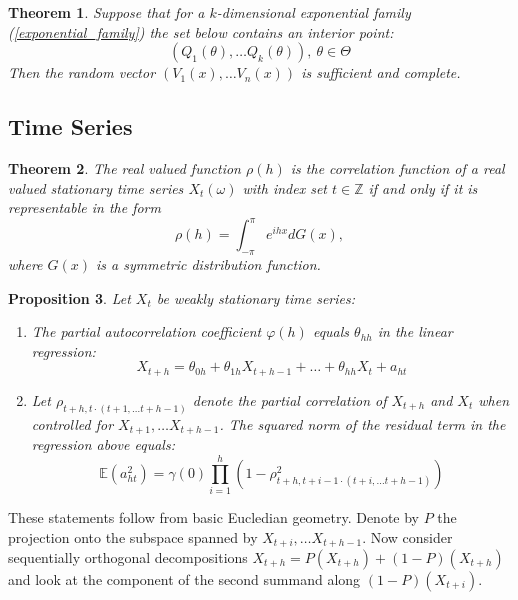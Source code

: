\documentclass[12pt]{article}
\newtheorem{theorem}{Theorem}[section]
\newtheorem{proposition}[theorem]{Proposition}
\theoremstyle{definition}
\theoremstyle{remark}
\numberwithin{equation}{section}
\newcommand{\ZZ}{\mathbb{Z}}
\newcommand{\EE}{\mathbb{E}}
\begin{document}
\begin{theorem}
	Suppose that for a $k$-dimensional exponential family (\ref{exponential_family}) the set below contains an interior point:
\begin{equation*}
	(Q_1(\theta),\ldots Q_k(\theta)),\ \theta\in\Theta
\end{equation*}
Then the random vector $\left(V_1(x),\ldots V_n(x)\right)$ is sufficient and complete.
\end{theorem}


\subsection{Time Series}

\begin{theorem}
	The real valued function $\rho(h)$ is the correlation function of a real valued stationary time series $X_t(\omega)$ with index set $t\in\ZZ$ if and only if it is representable in the form
\begin{equation*}
	\rho(h) = \int_{-\pi}^\pi e^{ihx}dG(x),
\end{equation*}
	where $G(x)$ is a symmetric distribution function.
\end{theorem}


\begin{proposition}\label{pac_properties} Let $X_t$ be weakly stationary time series:
	\begin{enumerate}
		\item The partial autocorrelation coefficient $\varphi(h)$ equals $\theta_{hh}$ in the linear regression:
		\begin{equation*}
			X_{t+h} = \theta_{0h} + \theta_{1h}X_{t+h-1} + \ldots + \theta_{hh}X_t + a_{ht}
		\end{equation*}
		\item Let $\rho_{t+h,t\cdot(t+1, \ldots t+h-1)}$ denote the partial correlation of $X_{t+h}$ and $X_t$ when controlled for $X_{t+1}, \ldots X_{t+h-1}$. The squared norm of the residual term in the regression above equals:
		\begin{equation*}
			\EE(a_{ht}^2) = \gamma(0)\prod_{i = 1}^{h}(1-\rho_{t+h, t+i-1\cdot(t+i, \ldots t+h-1)}^2)
		\end{equation*}
	\end{enumerate}
\end{proposition}
\proof These statements follow from basic Eucledian geometry. Denote by $P$ the projection onto the subspace spanned by $X_{t+i}, \ldots X_{t+h-1}$. Now consider sequentially orthogonal decompositions $X_{t+h} = P(X_{t+h}) + (1 - P)(X_{t+h})$ and look at the component of the second summand along $(1 - P)(X_{t+i})$.
\end{document}
